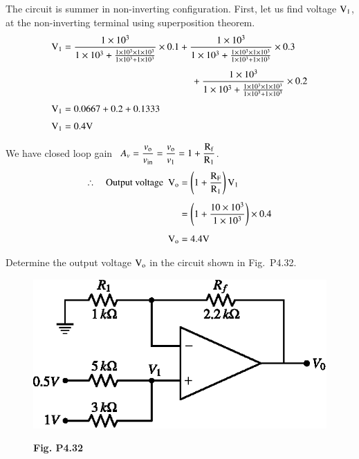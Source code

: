 \begin{solution}
The circuit is summer in non-inverting configuration. First, let us find voltage $\textrm{V}_{1}$, at the non-inverting terminal using superposition theorem.
\begin{align*}
\rmV_{1} &= \frac{1\times 10^{3}}{1\times 10^{3}+\frac{1\times 10^{3}\times 1\times 10^{3}}{1\times 10^{3}+1\times 10^{3}}}\times 0.1+\frac{1\times 10^{3}}{1\times 10^{3}+\frac{1\times 10^{3}\times 1\times 10^{3}}{1\times 10^{3}+1\times 10^{3}}}\times 0.3\\[4pt]
&\hspace{4.7cm} +\dfrac{1\times 10^{3}}{1\times 10^{3}+\frac{1\times 10^{3}\times 1\times 10^{3}}{1\times 10^{3}+1\times 10^{3}}}\times 0.2\\[4pt]
\rmV_{1} &= 0.0667+0.2+0.1333\\[3pt]
\rmV_{1} &= 0.4\rmV
\end{align*}

We have closed loop gain \ $A_{v}=\dfrac{v_{\textrm{o}}}{v_{\text{in}}}=\dfrac{v_{\textrm{o}}}{v_{1}}=1+\dfrac{\textrm{R}_{\textrm{f}}}{\textrm{R}_{1}}$.
\begin{align*}
\therefore\quad \text{Output voltage~ } \textrm{V}_{\textrm{o}} &= \left(1+\dfrac{\textrm{R}_{\textrm{F}}}{\textrm{R}_{1}}\right)\textrm{V}_{1}\\[4pt]
&= \left(1+\dfrac{10\times 10^{3}}{1\times 10^{3}}\right)\times 0.4\\[4pt]
\textrm{V}_{\textrm{o}} &= 4.4\textrm{V}
\end{align*}
\end{solution}

\eject

\begin{problem}\label{prob4.32}
Determine the output voltage $\textrm{V}_{\textrm{o}}$ in the circuit shown in Fig.~P4.32.
\begin{figure}[H]
\centering
\includegraphics[scale=.95]{chap4/figP4.31.eps}

\smallskip
{\bf Fig. P4.32}
\end{figure}
\end{problem}

